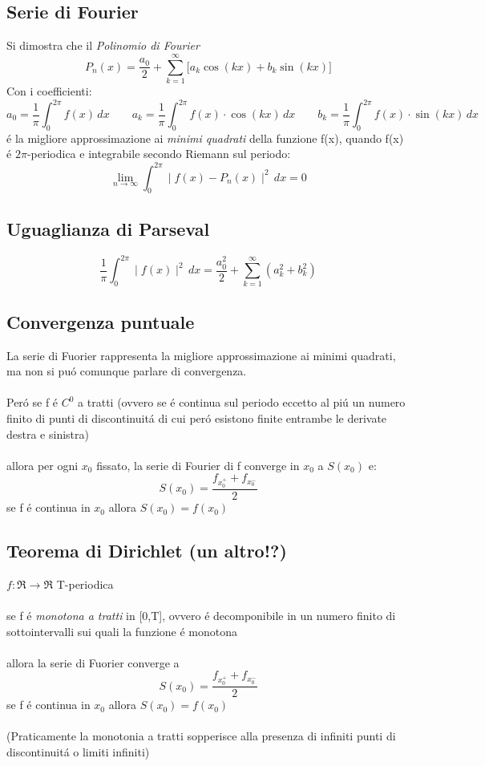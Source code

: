 \documentclass[a4paper,10pt,italian]{article}
\begin{document}
\subsection{Serie di Fourier}
Si dimostra che il \emph{Polinomio di Fourier}
$$ P_n(x) = \frac{a_0}{2} + \sum_{k=1}^{\infty} \Bigr[ a_k\cos(kx) + b_k \sin(kx) \Bigr] $$
Con i coefficienti:
$$ a_0 = \frac{1}{\pi}\int_{0}^{2\pi} f(x)\,dx 
\qquad a_k = \frac{1}{\pi}\int_{0}^{2\pi} f(x) \cdot \cos(kx)\,dx 
\qquad b_k = \frac{1}{\pi}\int_{0}^{2\pi} f(x) \cdot \sin(kx)\,dx   $$
\'e la migliore approssimazione ai \emph{minimi quadrati} della funzione f(x), quando f(x) \'e $2\pi$-periodica e integrabile secondo Riemann sul periodo:
$$ \lim_{n \rightarrow \infty} \int_{0}^{2\pi} \mid f(x) - P_n(x) \mid ^2 \,dx = 0 $$

\subsection{Uguaglianza di Parseval}
$$ \frac{1}{\pi} \int_{0}^{2\pi} \mid f(x) \mid ^2\,dx = \frac{a_0^2}{2}+\sum_{k=1}^{\infty} (a_k^2+b_k^2) $$

\subsection{Convergenza puntuale}
La serie di Fuorier rappresenta la migliore approssimazione ai minimi quadrati, ma non si pu\'o comunque parlare di convergenza. \\ \\
Per\'o se f \'e $C^0$ a tratti (ovvero se \'e continua sul periodo eccetto al pi\'u un numero finito di punti di discontinuit\'a 
di cui per\'o esistono finite entrambe le derivate destra e sinistra) \\ \\
allora per ogni $x_0$ fissato, la serie di Fourier di f converge in $x_0$ a $S(x_0)$ e:
$$ S(x_0) = \frac{f_{x_0^+} + f_{x_0^-}}{2}$$
se f \'e continua in $x_0$ allora $S(x_0) = f(x_0)$

\subsection{Teorema di Dirichlet (un altro!?)}
$f:\Re \rightarrow \Re$ T-periodica \\ \\
se f \'e \emph{monotona a tratti} in [0,T], ovvero \'e decomponibile in un numero finito di sottointervalli sui quali la funzione \'e monotona \\ \\
allora la serie di Fuorier converge a 
$$ S(x_0) = \frac{f_{x_0^+} + f_{x_0^-}}{2}$$
se f \'e continua in $x_0$ allora $S(x_0) = f(x_0)$ \\ \\
(Praticamente la monotonia a tratti sopperisce alla presenza di infiniti punti di discontinuit\'a o limiti infiniti)
\end{document}
